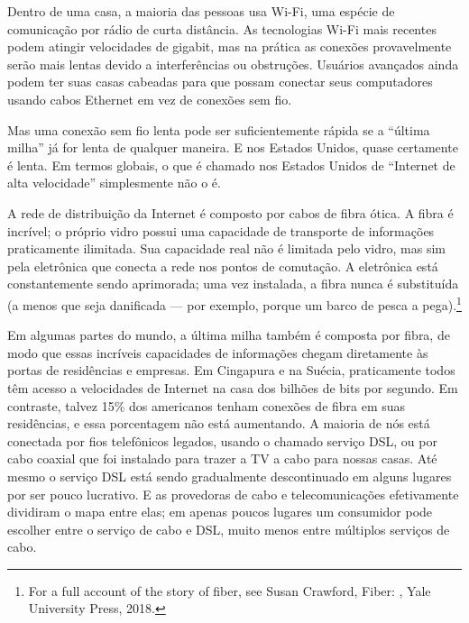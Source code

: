 Dentro de uma casa, a maioria das pessoas usa Wi-Fi, uma espécie de comunicação por rádio de
curta distância. As tecnologias Wi-Fi mais recentes podem atingir velocidades de gigabit, mas
na prática as conexões provavelmente serão mais lentas devido a interferências ou obstruções.
Usuários avançados ainda podem ter suas casas cabeadas para que possam conectar seus
computadores usando cabos Ethernet em vez de conexões sem fio.

Mas uma conexão sem fio lenta pode ser suficientemente rápida se a ``última milha'' já for
lenta de qualquer maneira. E nos Estados Unidos, quase certamente é lenta. Em termos globais,
o que é chamado nos Estados Unidos de ``Internet de alta velocidade'' simplesmente não o é.

A rede de distribuição da Internet é composto por cabos de fibra ótica. A fibra é incrível; o
próprio vidro possui uma capacidade de transporte de informações praticamente ilimitada. Sua
capacidade real não é limitada pelo vidro, mas sim pela eletrônica que conecta a rede nos
pontos de comutação. A eletrônica está constantemente sendo aprimorada; uma vez instalada, a
fibra nunca é substituída (a menos que seja danificada --- por exemplo, porque um barco de
pesca a pega).\footnote{For a full account of the story of fiber, see Susan Crawford, Fiber:
, Yale University Press,
2018.}

Em algumas partes do mundo, a última milha também é composta por fibra, de modo que essas
incríveis capacidades de informações chegam diretamente às portas de residências e empresas.
Em Cingapura e na Suécia, praticamente todos têm acesso a velocidades de Internet na casa dos
bilhões de bits por segundo. Em contraste, talvez 15\% dos americanos tenham conexões de fibra
em suas residências, e essa porcentagem não está aumentando. A maioria de nós está conectada
por fios telefônicos legados, usando o chamado serviço DSL, ou por cabo coaxial que foi
instalado para trazer a TV a cabo para nossas casas. Até mesmo o serviço DSL está sendo
gradualmente descontinuado em alguns lugares por ser pouco lucrativo. E as provedoras de cabo
e telecomunicações efetivamente dividiram o mapa entre elas; em apenas poucos lugares um
consumidor pode escolher entre o serviço de cabo e DSL, muito menos entre múltiplos serviços
de cabo.

